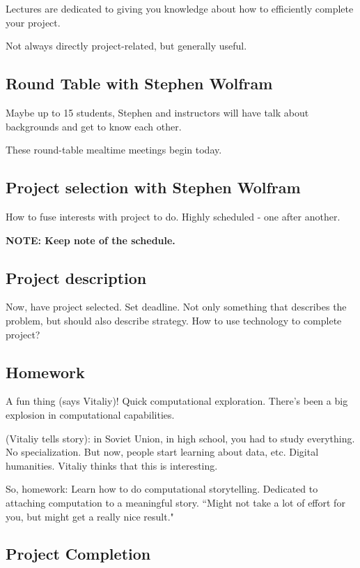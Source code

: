 \documentclass[11pt]{article}
\theoremstyle{definition}
\begin{document}
Lectures are dedicated to giving you knowledge about how to efficiently complete your project. 

Not always directly project-related, but generally useful. 

\subsection{Round Table with Stephen Wolfram}

Maybe up to 15 students, Stephen and instructors will have talk about backgrounds and get to know each other. 

These round-table mealtime meetings begin today. 

\subsection{Project selection with Stephen Wolfram}

How to fuse interests with project to do. Highly scheduled - one after another. 

\textbf{NOTE: Keep note of the schedule. }

\subsection{Project description}

Now, have project selected. Set deadline. Not only something that describes the problem, but should also describe strategy. How to use technology to complete project?

\subsection{Homework}

A fun thing (says Vitaliy)! Quick computational exploration. There's been a big explosion in computational capabilities. 

(Vitaliy tells story): in Soviet Union, in high school, you had to study everything. No specialization. But now, people start learning about data, etc. Digital humanities. Vitaliy thinks that this is interesting. 

So, homework: Learn how to do computational storytelling. Dedicated to attaching computation to a meaningful story. ``Might not take a lot of effort for you, but might get a really nice result."

\subsection{Project Completion}
\end{document}

